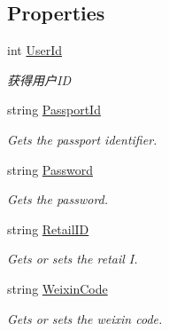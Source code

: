 \subsection*{Properties}
\begin{DoxyCompactItemize}
\item 
\mbox{\label{class_t_net_1_1_sns_1_1_sns_center_user_ab24f18caf839ae0c76339ecb57dbdfd9}} 
int \mbox{\hyperlink{class_t_net_1_1_sns_1_1_sns_center_user_ab24f18caf839ae0c76339ecb57dbdfd9}{User\+Id}}
\begin{DoxyCompactList}\small\item\em 获得用户\+ID \end{DoxyCompactList}\item 
string \mbox{\hyperlink{class_t_net_1_1_sns_1_1_sns_center_user_abf70c3bed11cd1f81afe5ba30e483412}{Passport\+Id}}
\begin{DoxyCompactList}\small\item\em Gets the passport identifier. \end{DoxyCompactList}\item 
string \mbox{\hyperlink{class_t_net_1_1_sns_1_1_sns_center_user_a9063f05c104fcc146a8a87bafadf5eea}{Password}}
\begin{DoxyCompactList}\small\item\em Gets the password. \end{DoxyCompactList}\item 
string \mbox{\hyperlink{class_t_net_1_1_sns_1_1_sns_center_user_a946b7ee270887becc6cb2e02b5174946}{Retail\+ID}}
\begin{DoxyCompactList}\small\item\em Gets or sets the retail I. \end{DoxyCompactList}\item 
string \mbox{\hyperlink{class_t_net_1_1_sns_1_1_sns_center_user_af63ab8e0d91da916bd8586abe8779cdd}{Weixin\+Code}}
\begin{DoxyCompactList}\small\item\em Gets or sets the weixin code. \end{DoxyCompactList}\item 

\end{DoxyCompactItemize}
